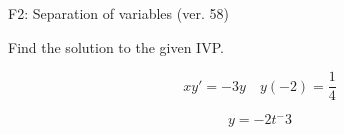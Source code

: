 \begin{exercise}
  \begin{exerciseTitle}F2: Separation of variables (ver. 58)\end{exerciseTitle}
  \begin{exerciseStatement}
    
Find the solution to the given IVP.

    
\[xy'= -3 y \hspace{1em} y( -2 ) = \frac{1}{4}\]

  \end{exerciseStatement}
  \begin{exerciseAnswer}
    
\[y= -2 t^ -3\]

  \end{exerciseAnswer}
\end{exercise}